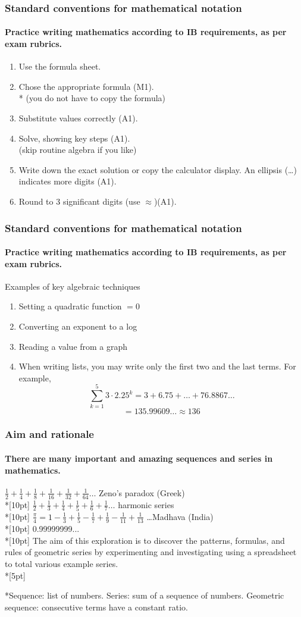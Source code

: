 \documentclass{beamer}
\begin{document}
\frame
{
  \frametitle{Standard conventions for mathematical notation}
  \framesubtitle{Practice writing mathematics according to IB requirements, as per exam rubrics.}
\begin{enumerate}
    \item Use the formula sheet.
    \item Chose the appropriate formula (M1).\\*
    (you do not have to copy the formula)
    \item Substitute values correctly (A1). 
    \item Solve, showing key steps (A1).\\
    (skip routine algebra if you like)
    \item Write down the exact solution or copy the calculator display. An ellipsis (\ldots) indicates more digits (A1).
    \item Round to 3 significant digits (use $\approx$)(A1).
\end{enumerate}
}

\frame
{
  \frametitle{Standard conventions for mathematical notation}
  \framesubtitle{Practice writing mathematics according to IB requirements, as per exam rubrics.}
Examples of key algebraic techniques
\begin{enumerate}
    \item Setting a quadratic function $=0$
    \item Converting an exponent to a log
    \item Reading a value from a graph
    \item When writing lists, you may write only the first two and the last terms. For example,
\[\sum_{k=1}^5 3 \cdot 2.25^k =3 + 6.75+\ldots+76.8867\ldots\]
\[=135.99609\ldots \approx 136\]
\end{enumerate}
}

\frame
{
  \frametitle{Aim and rationale}
  \framesubtitle{There are many important and amazing sequences and series in mathematics.}
  $\displaystyle \frac{1}{2}+\frac{1}{4}+\frac{1}{8}+\frac{1}{16}+\frac{1}{32}+\frac{1}{64} \dots$ Zeno's paradox (Greek)\\*[10pt]  $\displaystyle \frac{1}{2}+\frac{1}{3}+\frac{1}{4}+\frac{1}{5}+\frac{1}{6}+\frac{1}{7} \dots$ harmonic series\\*[10pt]
  $\displaystyle \frac{\pi}{4}=1-\frac{1}{3}+\frac{1}{5}-\frac{1}{7}+\frac{1}{9}-\frac{1}{11}+\frac{1}{13}$ \dots Madhava  (India)\\*[10pt]
  0.99999999...\\*[10pt]
The aim of this exploration is to discover the patterns, formulas, and rules of geometric series by experimenting and investigating using a spreadsheet to total various example series.\\*[5pt]
  
*Sequence: list of numbers. Series: sum of a sequence of numbers. Geometric sequence: consecutive terms have a constant ratio.
}
\end{document}
